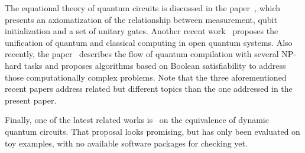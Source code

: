 The equational theory of quantum circuits is discussed in the paper~\cite{Staton}, which presents an axiomatization of the relationship between measurement, qubit initialization and a set of unitary gates.
Another recent work~\cite{Wang19} proposes the unification of quantum and classical computing in open quantum systems.
Also recently, the paper~\cite{doi:10.1098/rsta.2019.0161} describes the flow of quantum compilation with several NP-hard tasks and proposes algorithms based on Boolean satisfiability to address those computationally complex problems.
Note that the three aforementioned recent papers address related but different topics than the one addressed in the present paper.

Finally, one of the latest related works is~\cite{Wang21} on the equivalence of dynamic quantum circuits.
That proposal looks promising, but has only been evaluated on toy examples, with no available software packages for checking yet.